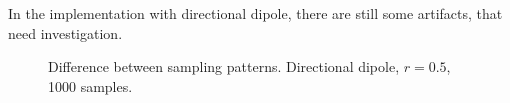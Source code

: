 \documentclass[12pt, twoside,a4paper]{article}
\begin{document}
In the implementation with directional dipole, there are still some artifacts, that need investigation.
\begin{figure}[!ht]
\centering
{} 
 
\caption{Difference between sampling patterns. Directional dipole, $r = 0.5$, 1000 samples.}
\label{fig:img}
\end{figure}


\end{document}
